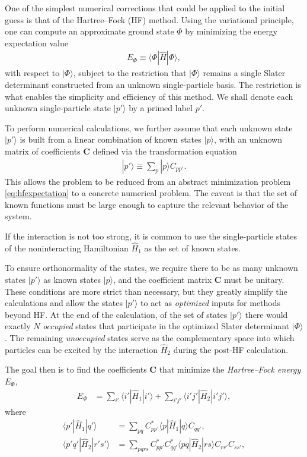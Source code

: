 One of the simplest numerical corrections that could be applied to the initial guess is that of the Hartree--Fock (HF) method.  Using the variational principle, one can compute an approximate ground state $\Phi$ by minimizing the energy expectation value
\begin{align} \label{eq:hfexpectation}
  E_{\Phi} \equiv \langle \Phi | \hat H | \Phi \rangle,
\end{align}
with respect to $|\Phi\rangle$, subject to the restriction that $|\Phi\rangle$ remains a single Slater determinant constructed from an unknown single-particle basis.  The restriction is what enables the simplicity and efficiency of this method.  We shall denote each unknown single-particle state $|p'\rangle$ by a primed label $p'$.

To perform numerical calculations, we further assume that each unknown state $|p'\rangle$ is built from a linear combination of known states $|p\rangle$, with an unknown matrix of coefficients $\bm C$ defined via the transformation equation
\begin{align*}
  |p'\rangle \equiv \sum_p |p\rangle C_{p p'}.
\end{align*}
This allows the problem to be reduced from an abstract minimization problem \eqref{eq:hfexpectation} to a concrete numerical problem.  The caveat is that the set of known functions must be large enough to capture the relevant behavior of the system.

If the interaction is not too strong, it is common to use the single-particle states of the noninteracting Hamiltonian $\hat{H}_1$ as the set of known states.

To ensure orthonormality of the states, we require there to be as many unknown states $|p'\rangle$ as known states $|p\rangle$, and the coefficient matrix $\bm C$ must be unitary.  These conditions are more strict than necessary, but they greatly simplify the calculations and allow the states $|p'\rangle$ to act as \textit{optimized} inputs for methods beyond HF.  At the end of the calculation, of the set of states $|p'\rangle$ there would exactly $N$ \textit{occupied} states that participate in the optimized Slater determinant $|\Phi\rangle$.  The remaining \textit{unoccupied} states serve as the complementary space into which particles can be excited by the interaction $\hat{H}_2$ during the post-HF calculation.

The goal then is to find the coefficients $\bm C$ that minimize the \textit{Hartree--Fock energy} $E_{\Phi}$,
\begin{align}
  E_{\Phi} &= \sum_{i'} \langle i' | \hat{H}_1 | i' \rangle + \sum_{i' j'} \langle i' j' | \hat{H}_2 | i' j' \rangle \label{eq:hfenergy},
\end{align}
where
\begin{align}
  \langle p' | \hat{H}_1 | q' \rangle &= \sum_{p q} C_{p p'}^* \langle p | \hat{H}_1 | q \rangle C_{q q'}^{}, \label{eq:hftransform1} \\
  \langle p' q' | \hat{H}_2 | r' s' \rangle &= \sum_{p q r s} C_{p p'}^* C_{q q'}^* \langle p q | \hat{H}_2 | r s \rangle C_{r r'}^{} C_{s s'}^{}, \label{eq:hftransform2}
\end{align}

